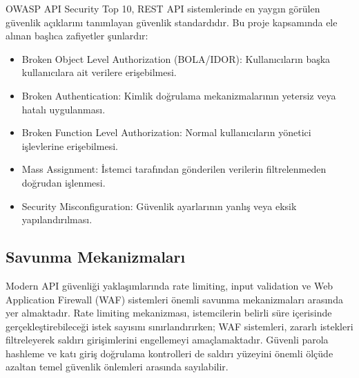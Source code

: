 OWASP API Security Top 10, REST API sistemlerinde en yaygın görülen güvenlik açıklarını tanımlayan güvenlik standardıdır. Bu proje kapsamında ele alınan başlıca zafiyetler şunlardır:

\begin{itemize}[leftmargin=*]
    \item Broken Object Level Authorization (BOLA/IDOR): Kullanıcıların başka kullanıcılara ait verilere erişebilmesi.
    \item Broken Authentication: Kimlik doğrulama mekanizmalarının yetersiz veya hatalı uygulanması.
    \item Broken Function Level Authorization: Normal kullanıcıların yönetici işlevlerine erişebilmesi.
    \item Mass Assignment: İstemci tarafından gönderilen verilerin filtrelenmeden doğrudan işlenmesi.
    \item Security Misconfiguration: Güvenlik ayarlarının yanlış veya eksik yapılandırılması.
\end{itemize}

\subsection{Savunma Mekanizmaları}
\label{savunma-mekanizmalar}

Modern API güvenliği yaklaşımlarında rate limiting, input validation ve Web Application Firewall (WAF) sistemleri önemli savunma mekanizmaları arasında yer almaktadır. Rate limiting mekanizması, istemcilerin belirli süre içerisinde gerçekleştirebileceği istek sayısını sınırlandırırken; WAF sistemleri, zararlı istekleri filtreleyerek saldırı girişimlerini engellemeyi amaçlamaktadır. Güvenli parola hashleme ve katı giriş doğrulama kontrolleri de saldırı yüzeyini önemli ölçüde azaltan temel güvenlik önlemleri arasında sayılabilir.


\clearpage
